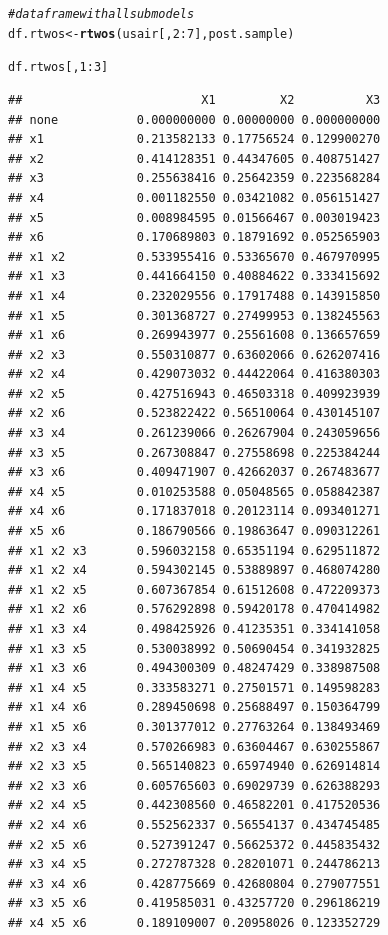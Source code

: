 \documentclass[11pt,a4paper,twoside]{book}\usepackage[]{graphicx}\usepackage[]{color}
\makeatletter
\newcommand{\hlnum}[1]{\textcolor[rgb]{0.686,0.059,0.569}{#1}}%
\newcommand{\hlcom}[1]{\textcolor[rgb]{0.678,0.584,0.686}{\textit{#1}}}%
\newcommand{\hlopt}[1]{\textcolor[rgb]{0,0,0}{#1}}%
\newcommand{\hlstd}[1]{\textcolor[rgb]{0.345,0.345,0.345}{#1}}%
\newcommand{\hlkwb}[1]{\textcolor[rgb]{0.69,0.353,0.396}{#1}}%
\newcommand{\hlkwd}[1]{\textcolor[rgb]{0.737,0.353,0.396}{\textbf{#1}}}%
\newenvironment{kframe}{%
 \def\at@end@of@kframe{}%
 \ifinner\ifhmode%
  \def\at@end@of@kframe{\end{minipage}}%
  \begin{minipage}{\columnwidth}%
 \fi\fi%
 \def\FrameCommand##1{\hskip\@totalleftmargin \hskip-\fboxsep
 \colorbox{shadecolor}{##1}\hskip-\fboxsep
     \hskip-\linewidth \hskip-\@totalleftmargin \hskip\columnwidth}%
 \MakeFramed {\advance\hsize-\width
   \@totalleftmargin\z@ \linewidth\hsize
   \@setminipage}}%
 {\par\unskip\endMakeFramed%
 \at@end@of@kframe}
\newenvironment{knitrout}{}{} %
\makeatother
\begin{document}
\begin{knitrout}
\begin{kframe}
\begin{alltt}
\hlcom{#data frame with all submodels}
\hlstd{df.rtwos} \hlkwb{<-}\hlkwd{rtwos}\hlstd{(usair[,}\hlnum{2}\hlopt{:}\hlnum{7}\hlstd{], post.sample)}

\hlstd{df.rtwos[,}\hlnum{1}\hlopt{:}\hlnum{3}\hlstd{]}
\end{alltt}
\begin{verbatim}
##                         X1         X2          X3
## none           0.000000000 0.00000000 0.000000000
## x1             0.213582133 0.17756524 0.129900270
## x2             0.414128351 0.44347605 0.408751427
## x3             0.255638416 0.25642359 0.223568284
## x4             0.001182550 0.03421082 0.056151427
## x5             0.008984595 0.01566467 0.003019423
## x6             0.170689803 0.18791692 0.052565903
## x1 x2          0.533955416 0.53365670 0.467970995
## x1 x3          0.441664150 0.40884622 0.333415692
## x1 x4          0.232029556 0.17917488 0.143915850
## x1 x5          0.301368727 0.27499953 0.138245563
## x1 x6          0.269943977 0.25561608 0.136657659
## x2 x3          0.550310877 0.63602066 0.626207416
## x2 x4          0.429073032 0.44422064 0.416380303
## x2 x5          0.427516943 0.46503318 0.409923939
## x2 x6          0.523822422 0.56510064 0.430145107
## x3 x4          0.261239066 0.26267904 0.243059656
## x3 x5          0.267308847 0.27558698 0.225384244
## x3 x6          0.409471907 0.42662037 0.267483677
## x4 x5          0.010253588 0.05048565 0.058842387
## x4 x6          0.171837018 0.20123114 0.093401271
## x5 x6          0.186790566 0.19863647 0.090312261
## x1 x2 x3       0.596032158 0.65351194 0.629511872
## x1 x2 x4       0.594302145 0.53889897 0.468074280
## x1 x2 x5       0.607367854 0.61512608 0.472209373
## x1 x2 x6       0.576292898 0.59420178 0.470414982
## x1 x3 x4       0.498425926 0.41235351 0.334141058
## x1 x3 x5       0.530038992 0.50690454 0.341932825
## x1 x3 x6       0.494300309 0.48247429 0.338987508
## x1 x4 x5       0.333583271 0.27501571 0.149598283
## x1 x4 x6       0.289450698 0.25688497 0.150364799
## x1 x5 x6       0.301377012 0.27763264 0.138493469
## x2 x3 x4       0.570266983 0.63604467 0.630255867
## x2 x3 x5       0.565140823 0.65974940 0.626914814
## x2 x3 x6       0.605765603 0.69029739 0.626388293
## x2 x4 x5       0.442308560 0.46582201 0.417520536
## x2 x4 x6       0.552562337 0.56554137 0.434745485
## x2 x5 x6       0.527391247 0.56625372 0.445835432
## x3 x4 x5       0.272787328 0.28201071 0.244786213
## x3 x4 x6       0.428775669 0.42680804 0.279077551
## x3 x5 x6       0.419585031 0.43257720 0.296186219
## x4 x5 x6       0.189109007 0.20958026 0.123352729

\end{verbatim}
\end{kframe}
\end{knitrout}
\end{document}
